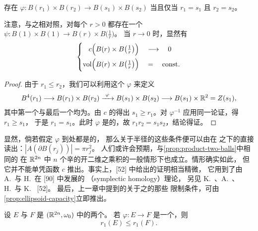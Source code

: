 \begin{proposition}\label{prop:product-two-balls}
存在\trSymplecticDiffeomorphism{} $\varphi:B(r_1)\times B(r_2)\to%
B(s_1)\times B(s_2)$ 当且仅当 $r_1=s_1$ 且 $r_2=s_2$。
\end{proposition}

注意，与之相对照，对每个 $r>0$ 都存在一个\trLinear\trVolumePreserving\trDiffeomorphism{}%
$\psi:B(1)\times B(1)\to B(r)\times B\bigl(\frac{1}{r}\bigr)$。%
当 $r\to0$ 时，显然有
\[
\left\{
\begin{aligned}
c\Bigl(B(r)\times B\bigl(\tfrac{1}{r}\bigr)\Bigr)\quad&\longrightarrow\quad 0\\
\operatorname{vol}\Bigl(B(r)\times B\bigl(\tfrac{1}{r}\bigr)\Bigr)\quad&=\quad\text{const.}
\end{aligned}
\right.
\]

\begin{proof}
由于 $r_1\leq r_2$，我们可以利用这个\trDiffeomorphism{} $\varphi$ 来定义%
\trSymplecticEmbedding
\[
B^{4}(r_1)\longrightarrow B(r_1)\times B(r_2)\xrightarrow{\ \varphi\ }%
B(s_1)\times B(s_2)\longrightarrow B(s_1)\times\R^{2}=Z(s_1),
\]
其中第一个与最后一个\trMapping{}均为\trInclusionMapping。由 $c$ 的\trMonotonicity{}得出%
$s_1\geq r_1$。对 $\varphi^{-1}$ 应用同一论证，得 $r_1\geq s_1$，%
于是 $r_1=s_1$。此时 $\varphi$ 是\trVolumePreserving{}的，故 $r_1r_2=s_1s_2$，结论得证。
\end{proof}

显然，倘若假定 $\varphi$ 到\trBoundary{}处都是\trSmooth{}的，%
那么关于半径的这些条件便可以由\trAction{}在\trSymplecticDiffeomorphism{}%
之下的\trInvariance{}直接读出：$|A(\partial B(r_j))|=\pi r_j^{2}$。%
人们或许会预期，与\cref{prop:product-two-balls}中相同的\trRigidity{}%
在 $\mathbb{R}^{2n}$ 中 $n$ 个辛的开二维\trBall{}之乘积的一般情形下也成立。情形确实如此，%
但它并不能单凭\trCapacity{}函数 $c$ 推出。事实上，[52] 中给出的证明相当精微，%
它用到了由 A.~\trFloer{}与 H.~\trHofer{}在 [90] 中发展的%
\textbf{\trSymplectic\trHomology}（symplectic homology）理论，%
另见 K.~\trCieliebak、A.~\trFloer、H.~\trHofer{}与 K.~\trWysocki{} [52]。%
最后，上一章中提到的关于\trEllipsoid{}之\trSymplecticEmbedding{}的那些%
限制条件，可由\cref{prop:ellipsoid-capacity}立即推出。

\begin{proposition}\label{prop:ellipsoid-r1-embedding}
设 $E$ 与 $F$ 是 $(\mathbb{R}^{2n},\omega_0)$ 中的两个\trEllipsoid。%
若 $\varphi:E\to F$ 是一个\trSymplecticEmbedding，则
\[
r_1(E)\leq r_1(F).
\]
\end{proposition}

